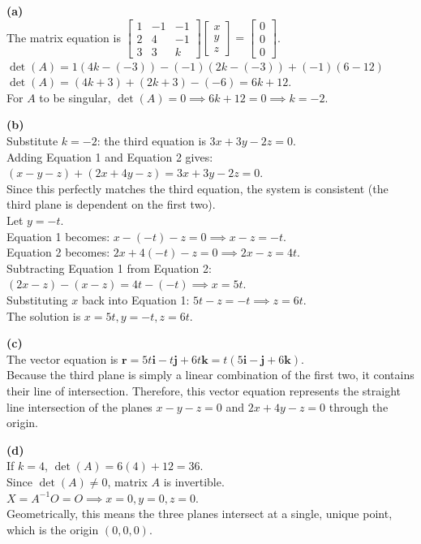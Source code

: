 \begin{solution}
\textbf{(a)} \\
The matrix equation is $\begin{bmatrix} 1 & -1 & -1 \\ 2 & 4 & -1 \\ 3 & 3 & k \end{bmatrix} \begin{bmatrix} x \\ y \\ z \end{bmatrix} = \begin{bmatrix} 0 \\ 0 \\ 0 \end{bmatrix}$. \\
$\det(A) = 1(4k - (-3)) - (-1)(2k - (-3)) + (-1)(6 - 12)$ \\
$\det(A) = (4k + 3) + (2k + 3) - (-6) = 6k + 12$. \\
For $A$ to be singular, $\det(A) = 0 \implies 6k + 12 = 0 \implies k = -2$.

\medskip
\textbf{(b)} \\
Substitute $k = -2$: the third equation is $3x + 3y - 2z = 0$. \\
Adding Equation 1 and Equation 2 gives: \\
$(x - y - z) + (2x + 4y - z) = 3x + 3y - 2z = 0$. \\
Since this perfectly matches the third equation, the system is consistent (the third plane is dependent on the first two). \\
Let $y = -t$. \\
Equation 1 becomes: $x - (-t) - z = 0 \implies x - z = -t$. \\
Equation 2 becomes: $2x + 4(-t) - z = 0 \implies 2x - z = 4t$. \\
Subtracting Equation 1 from Equation 2: $(2x - z) - (x - z) = 4t - (-t) \implies x = 5t$. \\
Substituting $x$ back into Equation 1: $5t - z = -t \implies z = 6t$. \\
The solution is $x = 5t, y = -t, z = 6t$.

\medskip
\textbf{(c)} \\
The vector equation is $\mathbf{r} = 5t\mathbf{i} - t\mathbf{j} + 6t\mathbf{k} = t(5\mathbf{i} - \mathbf{j} + 6\mathbf{k})$. \\
Because the third plane is simply a linear combination of the first two, it contains their line of intersection. Therefore, this vector equation represents the straight line intersection of the planes $x - y - z = 0$ and $2x + 4y - z = 0$ through the origin.

\medskip
\textbf{(d)} \\
If $k = 4$, $\det(A) = 6(4) + 12 = 36$. \\
Since $\det(A) \neq 0$, matrix $A$ is invertible. \\
$X = A^{-1}O = O \implies x = 0, y = 0, z = 0$. \\
Geometrically, this means the three planes intersect at a single, unique point, which is the origin $(0,0,0)$.
\end{solution}

